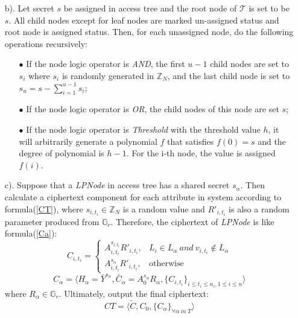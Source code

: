 \documentclass[smallextended]{svjour3}       %
\begin{document}
\begin{itemize}
\begin{itemize}
			\item [b).] Let secret $s$ be assigned in access tree and the root node of $\mathcal{T}$ is set to be $s$. 
						All child nodes except for leaf nodes are marked un-assigned status and root node is assigned status.
						Then, for each unassigned node, do the following operations recursively:
						\begin{itemize}
							\item [$\bullet$] If the node logic operator is \textit{AND}, the first $u-1$ child nodes are set to $s_i$ where $s_i$ is randomly generated in $\mathbb{Z}_N$, and the last child node is set to $s_u=s-\sum_{i=1}^{u-1}s_i$;
							\item [$\bullet$] If the node logic operator is \textit{OR},  the child nodes of this node are set $s$;	
							\item [$\bullet$] If the node logic operator is \textit{Threshold} with the threshold value $h$, it will arbitrarily generate a polynomial $f$ that satisfies $f(0)=s$ and the degree of polynomial is $h-1$. For the i-th node, the value is assigned $f(i)$. 
						\end{itemize}
			\item [c).] Suppose that a \textit{LPNode} in access tree has a shared secret $s_\alpha$. 
						Then calculate a ciphertext component for each attribute in system according to formula(\ref{CT}), where $s_{i,t_i} \in \mathbb{Z}_N$ is a random value and $R'_{i,t_i}$ is also a random parameter produced from $\mathbb{G}_r$. 
						Therefore, the ciphertext of \textit{LPNode} is like formula(\ref{Ca}):
			\begin{equation}\label{CT}
				C_{i,t_i}=
				\begin{cases}
				A_{i,t_i}^{s_{i,t_i}}R'_{i,t_i}, &\text{$L_i \in L_\alpha \ and \ v_{i,t_i} \notin L_\alpha$}\\
				A_{i,t_i}^{s_{\alpha}}R'_{i,t_i}, &\text{otherwise}
				\end{cases}
			\end{equation}
			\begin{equation}\label{Ca}
				C_\alpha = \langle H_\alpha=\bar{Y}^{s_\alpha}, \bar{C}_\alpha=A_0^{s_\alpha}R_\alpha, \{C_{i,t_i}\}_{i \leq t_i \leq n_i, 1 \leq i \leq n} \rangle
			\end{equation}
			where $R_\alpha \in \mathbb{G}_r$. Ultimately, output the final ciphertext:
			\begin{equation}
				CT=\langle \tilde{C},C_0,\{C_\alpha\}_{\forall \alpha \ in \ T} \rangle
			\end{equation}
		\end{itemize}
	

\end{itemize}
\end{document}
